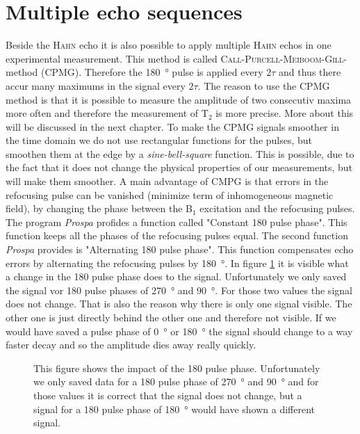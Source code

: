 \section{Multiple echo sequences}
\label{sec:Multipleechosequences}
Beside the \textsc{Hahn} echo it is also possible to apply multiple \textsc{Hahn} echos in one experimental measurement. This method is called \textsc{Call-Purcell-Meiboom-Gill}-method (CPMG). Therefore the \SI{180}{\degree} pulse is applied every $2\tau$ and thus there accur many maximums in the signal every $2\tau$. The reason to use the CPMG method is that it is possible to measure the amplitude of two consecutiv maxima more often and therefore the measurement of T$_2$ is more precise. More about this will be discussed in the next chapter.\newline
To make the CPMG signals smoother in the time domain we do not use rectangular functions for the pulses, but smoothen them at the edge by a \textit{sine-bell-square} function. This is possible, due to the fact that it does not change the physical properties of our measurements, but will make them smoother.\newline
A main advantage of CMPG is that errors in the refocusing pulse can be vanished (minimize term of inhomogeneous magnetic field), by changing the phase between the B$_1$ excitation and the refocusing pulses. The program \textit{Prospa} profides a function called "Constant 180 pulse phase". This function keeps all the phases of the refocusing pulses equal. The second function \textit{Prospa} provides is "Alternating 180 pulse phase". This function compensates echo errors by alternating the refocusing pulses by \SI{180}{\degree}. In figure \ref{fig:180pulsephasedegree} it is visible what a change in the 180 pulse phase does to the signal. Unfortunately we only saved the signal vor 180 pulse phases of \SI{270}{\degree} and \SI{90}{\degree}. For those two values the signal does not change. That is also the reason why there is only one signal visible. The other one is just directly behind the other one and therefore not visible. If we would have saved a pulse phase of \SI{0}{\degree} or \SI{180}{\degree} the signal should change to a way faster decay and so the amplitude dies away really quickly.

\begin{figure}[H]
    \centering
    
    \caption[This figure shows the impact of the 180 pulse phase.]{This figure shows the impact of the 180 pulse phase. Unfortunately we only saved data for a 180 pulse phase of \SI{270}{\degree} and \SI{90}{\degree} and for those values it is correct that the signal does not change, but a signal for a 180 pulse phase of \SI{180}{\degree} would have shown a different signal.}
    \label{fig:180pulsephasedegree}
\end{figure}
